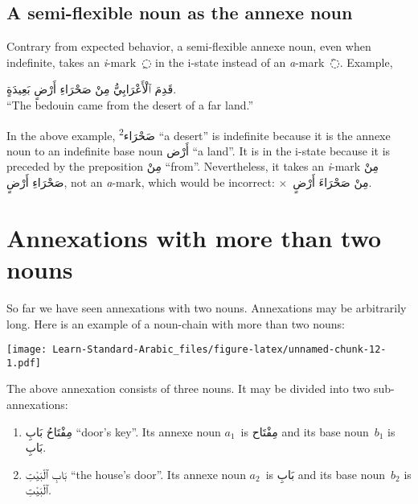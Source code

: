\documentclass[
  10pt,
]{book}
\providecommand{\tightlist}{%
  \setlength{\itemsep}{0pt}\setlength{\parskip}{0pt}}
\begin{document}
\subsection{A semi-flexible noun as the annexe noun}\label{a-semi-flexible-noun-as-the-annexe-noun}

Contrary from expected behavior, a semi-flexible annexe noun, even when indefinite, takes an \emph{i}-mark~\foreignlanguage{arabic}{◌ِ} in the i-state instead of an \emph{a}-mark~\foreignlanguage{arabic}{◌َ}. Example,

\foreignlanguage{arabic}{قَدِمَ ٱلْأَعْرَابِيُّ مِنْ صَحْرَاءِ أَرْضٍ بَعِيدَةٍ.}\\
\enquote{The bedouin came from the desert of a far land.}

In the above example,
\textsuperscript{2}\foreignlanguage{arabic}{صَحْرَاء} \enquote{a desert} is indefinite because it is the annexe noun to an indefinite base noun \foreignlanguage{arabic}{أَرْض} \enquote{a land}.
It is in the i-state because it is preceded by the preposition \foreignlanguage{arabic}{مِنْ} \enquote{from}.
Nevertheless, it takes an \emph{i}-mark \foreignlanguage{arabic}{مِنْ صَحْرَاءِ أَرْضٍ}, not an \emph{a}-mark, which would be incorrect: \(\times\)~\foreignlanguage{arabic}{مِنْ صَحْرَاءَ أَرْضٍ}.

\section{Annexations with more than two nouns}\label{annexations-with-more-than-two-nouns}

So far we have seen annexations with two nouns. Annexations may be arbitrarily long. Here is an example of a noun-chain with more than two nouns:

\texttt{[image: Learn-Standard-Arabic\_files/figure-latex/unnamed-chunk-12-1.pdf]}

The above annexation consists of three nouns. It may be divided into two sub-annexations:

\begin{enumerate}
\def\labelenumi{\roman{enumi}.}
\tightlist
\item
  \foreignlanguage{arabic}{مِفْتَاحُ بَابِ} \enquote{door's key}. Its annexe noun \(a_1\)~is \foreignlanguage{arabic}{مِفْتَاح} and its base noun~\(b_1\) is \foreignlanguage{arabic}{بَابِ}.
\item
  \foreignlanguage{arabic}{بَابِ ٱلْبَيْتِ} \enquote{the house's door}. Its annexe noun \(a_2\)~is \foreignlanguage{arabic}{بَابِ} and its base noun~\(b_2\) is \foreignlanguage{arabic}{ٱلْبَيْتِ}.
\end{enumerate}
\end{document}
